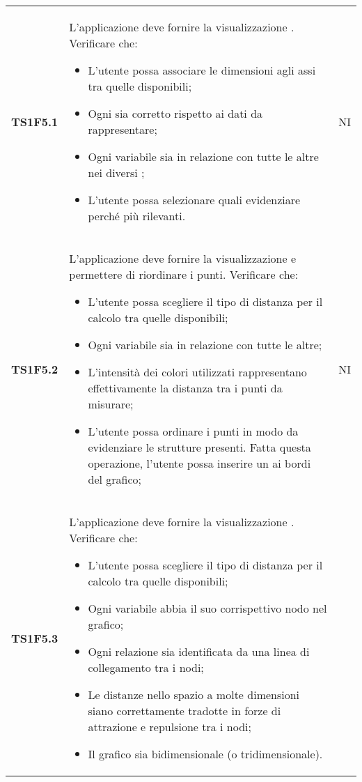 \begin{longtable}{C{2cm} C{12cm} C{1.5cm}}
			   
\textbf{TS1F5.1} & L'applicazione deve fornire la visualizzazione . Verificare che:
					\begin{itemize}
					\item L'utente possa associare le dimensioni agli assi tra quelle disponibili;						
						\item Ogni  sia corretto rispetto ai dati da rappresentare;
						\item Ogni variabile sia in relazione con tutte le altre nei diversi ;
						\item L'utente possa selezionare quali  evidenziare perché più rilevanti.
					\end{itemize}	
				  & NI \\
\textbf{TS1F5.2} & L'applicazione deve fornire la visualizzazione  e permettere di riordinare i punti. Verificare che:
					\begin{itemize}
						\item L'utente possa scegliere il tipo di distanza per il calcolo tra quelle disponibili;						
						\item Ogni variabile sia in relazione con tutte le altre; 
						\item L'intensità dei colori utilizzati rappresentano effettivamente la distanza tra i punti da misurare;
						\item L'utente possa ordinare i punti in modo da evidenziare le strutture presenti. Fatta questa operazione, l'utente possa inserire un  ai bordi del grafico;
					\end{itemize}	
				 & NI \\
\textbf{TS1F5.3} & L'applicazione deve fornire la visualizzazione . Verificare che:
					\begin{itemize}
					\item L'utente possa scegliere il tipo di distanza per il calcolo tra quelle disponibili;	
						\item Ogni variabile abbia il suo corrispettivo nodo nel grafico;
						\item Ogni relazione sia identificata da una linea di collegamento tra i nodi;
						\item Le distanze nello spazio a molte dimensioni siano correttamente tradotte in forze di attrazione e repulsione tra i nodi;
						\item Il grafico sia bidimensionale (o tridimensionale).
					\end{itemize}	

\end{longtable}
